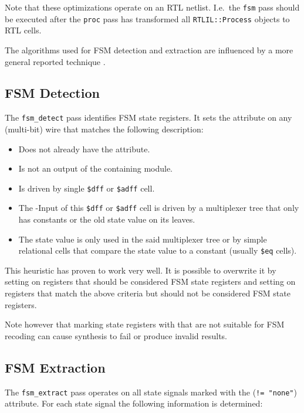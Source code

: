 Note that these optimizations operate on an RTL netlist. I.e.~the {\tt fsm} pass
should be executed after the {\tt proc} pass has transformed all
{\tt RTLIL::Process} objects to RTL cells.

The algorithms used for FSM detection and extraction are influenced by a more
general reported technique \cite{fsmextract}.

\subsection{FSM Detection}

The {\tt fsm\_detect} pass identifies FSM state registers. It sets the
 attribute on any (multi-bit) wire that matches
the following description:

\begin{itemize}
\item Does not already have the  attribute.
\item Is not an output of the containing module.
\item Is driven by single {\tt \$dff} or {\tt \$adff} cell.
\item The -Input of this {\tt \$dff} or {\tt \$adff} cell is driven by a multiplexer
tree that only has constants or the old state value on its leaves.
\item The state value is only used in the said multiplexer tree or by simple relational
cells that compare the state value to a constant (usually {\tt \$eq} cells).
\end{itemize}

This heuristic has proven to work very well. It is possible to overwrite it by setting
 on registers that should be considered FSM state registers
and setting  on registers that match the above criteria
but should not be considered FSM state registers.

Note however that marking state registers with  that are not
suitable for FSM recoding can cause synthesis to fail or produce invalid
results.

\subsection{FSM Extraction}

The {\tt fsm\_extract} pass operates on all state signals marked with the
 ({\tt != "none"}) attribute. For each state signal the following
information is determined:

